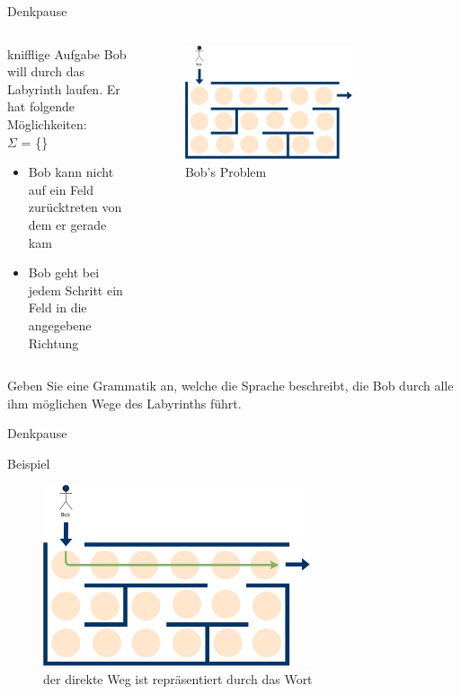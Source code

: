 {
\begin{frame}{Denkpause}
    \begin{columns}
    \begin{alertblock}{knifflige Aufgabe}
    Bob will durch das Labyrinth laufen. Er hat folgende Möglichkeiten:\\
    $\Sigma$ = \{\text{\Rewind, \MoveUp, \Forward, \MoveDown}\}
    \begin{itemize}
        \item Bob kann nicht auf ein Feld zurücktreten von dem er gerade kam
        \item Bob geht bei jedem Schritt ein Feld in die angegebene Richtung
    \end{itemize}
    \end{alertblock}
\begin{figure}
        \centering
        \includegraphics[width=0.7\textwidth]{../figures/GBeispiel.png}
        \caption{Bob's Problem}
        
    \end{figure}
\end{columns}
\alert{Geben Sie eine Grammatik an, welche die Sprache beschreibt, die Bob durch alle ihm möglichen Wege des Labyrinths führt.}
\end{frame}
}

{
\begin{frame}{Denkpause}
    \begin{alertblock}{Beispiel}
    \begin{figure}
        \centering
        \includegraphics[width=0.7\textwidth]{../figures/GBeispiel1.png}
        \caption{der direkte Weg ist repräsentiert durch das Wort \alert{\MoveDown\Forward\Forward\Forward\Forward\Forward\Forward}}
    \end{figure}
    \end{alertblock}
\end{frame}
}  


